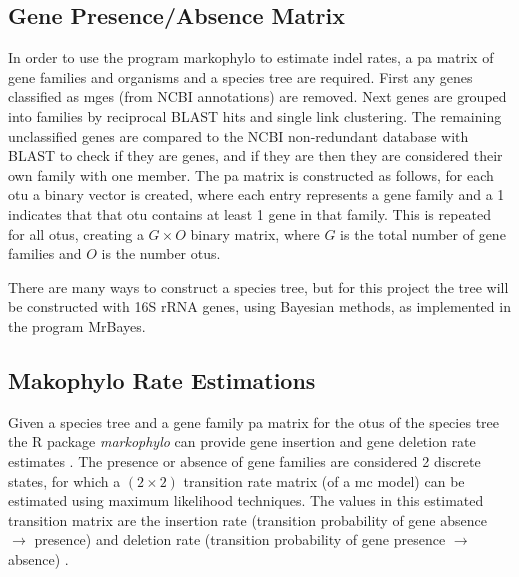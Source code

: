 \subsection*{Gene Presence/Absence Matrix}
In order to use the program markophylo to estimate indel rates, a \ac{pa} matrix of gene families and organisms and a species tree are required.
First any genes classified as \ac{mge}s (from NCBI annotations) are removed.
Next genes are grouped into families by reciprocal BLAST hits and single link clustering.
The remaining unclassified genes are compared to the NCBI non-redundant database with BLAST to check if they are genes, and if they are then they are considered their own family with one member.
The \ac{pa} matrix is constructed as follows, for each \ac{otu} a binary vector is created, where each entry represents a gene family and a 1 indicates that that \ac{otu} contains at least 1 gene in that family.
This is repeated for all \ac{otu}s, creating a $G \times O$ binary matrix, where $G$ is the total number of gene families and $O$ is the number \ac{otu}s.\par
There are many ways to construct a species tree, but for this project the tree will be constructed with 16S rRNA genes, using Bayesian methods, as implemented in the program MrBayes.
\subsection*{Makophylo Rate Estimations}
Given a species tree and a gene family \ac{pa} matrix for the \ac{otu}s of the species tree the R package \textit{markophylo} can provide gene insertion and gene deletion rate estimates \citep{marko}.
The presence or absence of gene families are considered 2 discrete states, for which a $(2\times 2)$ transition rate matrix (of a \ac{mc} model) can be estimated using maximum likelihood techniques.
The values in this estimated transition matrix are the insertion rate (transition probability of gene absence $\to$ presence) and deletion rate (transition probability of gene presence $\to$ absence) \citep{marko}.
